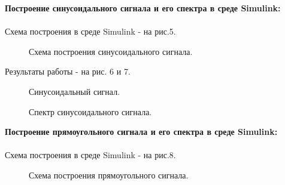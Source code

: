 \documentclass[12pt,a4paper]{report}
\begin{document}
\newpage
\textbf{Построение синусоидального сигнала и его спектра в среде Simulink:\\\\}
Схема построения в среде Simulink - на рис.5.
\begin{figure}[h!]
\caption{Схема построения синусоидального сигнала.}
\end{figure}

Результаты работы - на рис. 6 и 7.
\begin{figure}[h!]
\caption{Синусоидальный сигнал.}
\end{figure}
\begin{figure}[h!]
\caption{Спектр синусоидального сигнала.}
\end{figure}
\newpage
\textbf{Построение прямоугольного сигнала и его спектра в среде Simulink:\\\\}
Схема построения в среде Simulink - на рис.8.
\begin{figure}[h!]
\caption{Схема построения прямоугольного сигнала.}
\end{figure}
\end{document}
